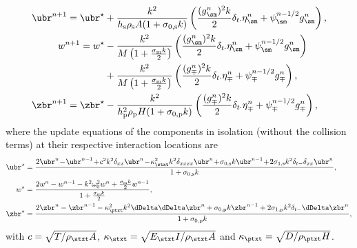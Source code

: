 \begin{subequations}\label{eq:statesBridgeNext}
    \begin{align}
        \ubr^{n+1} =\ubr^\star
        &+\frac{k^2}{h_\text{s}\rho_\text{s}A(1+\sigma_{0,\text{s}}k)}\left(\frac{(g_\sm^n)^2k}{2}\delta_{t\cdot}\eta_\sm^n+\psi_\sm^{n-1/2}g_\sm^n\right),\\
        w^{n+1} = w^\star&-\frac{k^2}{M\left(1+\frac{\sigma_\text{m}k}{2}\right)}\left(\frac{(g_\sm^n)^2k}{2}\delta_{t\cdot}\eta_\sm^n+\psi_\sm^{n-1/2}g_\sm^n\right)\\
        &+\frac{k^2}{M\left(1+\frac{\sigma_\text{m}k}{2}\right)}\left(\frac{(g_\mp^n)^2k}{2}\delta_{t\cdot}\eta_\mp^n+\psi_\mp^{n-1/2}g_\mp^n\right),\nonumber\\
        \zbr^{n+1} =\zbr^\star&-\frac{k^2}{h_\text{p}^2\rho_\text{p}H(1+\sigma_{0,\text{p}}k)}\left(\frac{(g_\mp^n)^2k}{2}\delta_{t\cdot}\eta_\mp^n+\psi_\mp^{n-1/2}g_\mp^n\right),
    \end{align}
\end{subequations}
where the update equations of the components in isolation (without the collision terms) at their respective interaction locations are
\begin{align*}
    \ubr^\star& = \frac{2\ubr^n\!-\!\ubr^{n-1}\!+\!c^2k^2\delta_{xx}\ubr^n\!-\!\kappa_\stxt^2k^2\delta_{xxxx}\ubr^n\! +\! \sigma_{0,\text{s}}k\ubr^{n-1}\! +\! 2\sigma_{1,\text{s}}k^2\delta_{t-}\delta_{xx}\ubr^n}{1 + \sigma_{0,\text{s}}k}, \\
    w^\star & = \frac{2w^n-w^{n-1}-k^2\omega_0^2w^n+\frac{\sigma_\text{m}k}{2}w^{n-1}}{1 + \frac{\sigma_\text{m}k}{2}},\\
    \zbr^\star & = \frac{2\zbr^n-\zbr^{n-1}-\kappa_\ptxt^2k^2\dDelta\dDelta\zbr^n+\sigma_{0,\text{p}}k\zbr^{n-1}+ 2\sigma_{1,\text{p}}k^2\delta_{t-}\dDelta\zbr^n}{1+\sigma_{0,\text{p}}k},
\end{align*}
with $c = \sqrt{T/\rho_\stxt A}$, $\kappa_\stxt = \sqrt{E_\stxt I /\rho_\stxt A}$ and $\kappa_\ptxt = \sqrt{D / \rho_\ptxt H}$.  

